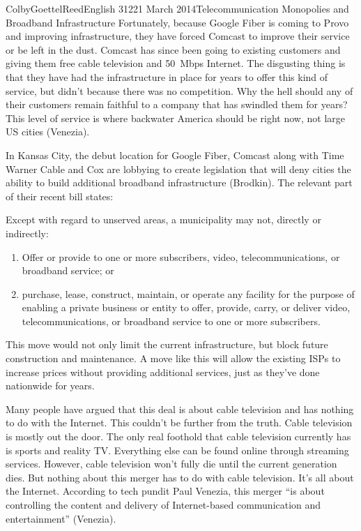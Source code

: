 \documentclass[12pt]{article}
\begin{document}
\begin{mla}{Colby}{Goettel}{Reed}{English 312}{21 March 2014}{Telecommunication Monopolies and Broadband Infrastructure}
Fortunately, because Google Fiber is coming to Provo and improving infrastructure, they have forced Comcast to improve their service or be left in the dust. Comcast has since been going to existing customers and giving them free cable television and 50~Mbps Internet. The disgusting thing is that they have had the infrastructure in place for years to offer this kind of service, but didn't because there was no competition. Why the hell should any of their customers remain faithful to a company that has swindled them for years? This level of service is where backwater America should be right now, not large US cities (Venezia).

In Kansas City, the debut location for Google Fiber, Comcast along with Time Warner Cable and Cox are lobbying to create legislation that will deny cities the ability to build additional broadband infrastructure (Brodkin). The relevant part of their recent bill states:
\begin{mlaquote}
    Except with regard to unserved areas, a municipality may not, directly or indirectly:
    
    \begin{enumerate}
        \item Offer or provide to one or more subscribers, video, telecommunications, or broadband service; or
        \item purchase, lease, construct, maintain, or operate any facility for the purpose of enabling a private business or entity to offer, provide, carry, or deliver video, telecommunications, or broadband service to one or more subscribers.
    \end{enumerate}
\end{mlaquote}
This move would not only limit the current infrastructure, but block future construction and maintenance. A move like this will allow the existing ISPs to increase prices without providing additional services, just as they've done nationwide for years.

Many people have argued that this deal is about cable television and has nothing to do with the Internet. This couldn't be further from the truth. Cable television is mostly out the door. The only real foothold that cable television currently has is sports and reality TV. Everything else can be found online through streaming services. However, cable television won't fully die until the current generation dies. But nothing about this merger has to do with cable television. It's all about the Internet. According to tech pundit Paul Venezia, this merger ``is about controlling the content and delivery of Internet-based communication and entertainment'' (Venezia).


\end{mla}
\end{document}
